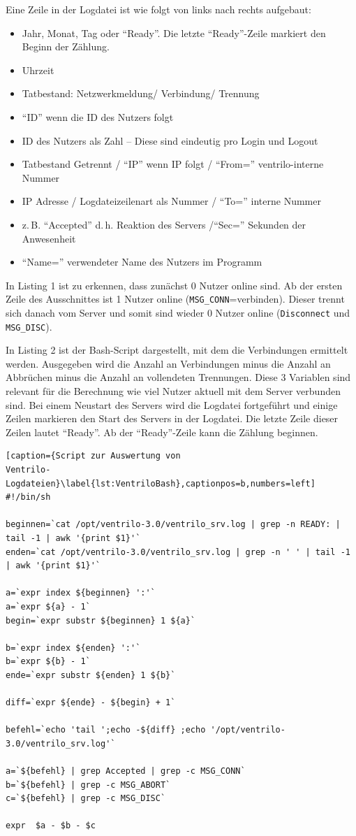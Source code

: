 \documentclass[12pt,ngerman,toc=listofnumbered,toc=bibliographynumbered,toc=index,headsepline=true]{scrbook}
\begin{document}
Eine Zeile in der Logdatei ist wie folgt von links nach rechts aufgebaut:
\begin{itemize}
  \item Jahr, Monat, Tag oder \enquote{Ready}. Die letzte \enquote{Ready}-Zeile
  markiert den Beginn der Zählung.
  \item Uhrzeit
  \item Tatbestand: Netzwerkmeldung/ Verbindung/ Trennung
  \item \enquote{ID}  wenn die ID des Nutzers folgt
  \item ID des Nutzers als Zahl -- Diese sind eindeutig pro Login und Logout
  \item Tatbestand Getrennt / \enquote{IP} wenn IP folgt / \enquote{From=}
  ventrilo-interne Nummer
  \item IP Adresse / Logdateizeilenart als Nummer / \enquote{To=} interne Nummer
  \item z.\,B. \enquote{Accepted} d.\,h. Reaktion des Servers /\enquote{Sec=}
  Sekunden der Anwesenheit
  \item \enquote{Name=} verwendeter Name des Nutzers im Programm 
\end{itemize}

In Listing 1 ist zu erkennen, dass zunächst 0 Nutzer
online sind. Ab der ersten Zeile des Ausschnittes ist 1 Nutzer online
(\texttt{MSG\_CONN}=verbinden). Dieser trennt sich danach vom Server und somit
sind wieder 0 Nutzer online (\texttt{Disconnect} und \texttt{MSG\_DISC}).

In Listing 2 ist der Bash-Script dargestellt, mit dem die Verbindungen ermittelt
werden. Ausgegeben wird die Anzahl an Verbindungen minus die Anzahl an Abbrüchen
minus die Anzahl an vollendeten Trennungen. Diese 3 Variablen sind relevant für
die Berechnung wie viel Nutzer aktuell mit dem Server verbunden sind. Bei einem
Neustart des Servers wird die Logdatei fortgeführt und einige Zeilen markieren
den Start des Servers in der Logdatei. Die letzte Zeile dieser Zeilen lautet
\enquote{Ready}. Ab der \enquote{Ready}-Zeile kann die Zählung beginnen.

\begin{lstlisting}[caption={Script zur Auswertung von
Ventrilo-Logdateien}\label{lst:VentriloBash},captionpos=b,numbers=left]
#!/bin/sh

beginnen=`cat /opt/ventrilo-3.0/ventrilo_srv.log | grep -n READY: | tail -1 | awk '{print $1}'`
enden=`cat /opt/ventrilo-3.0/ventrilo_srv.log | grep -n ' ' | tail -1 | awk '{print $1}'`

a=`expr index ${beginnen} ':'`
a=`expr ${a} - 1`
begin=`expr substr ${beginnen} 1 ${a}`

b=`expr index ${enden} ':'`
b=`expr ${b} - 1`
ende=`expr substr ${enden} 1 ${b}`

diff=`expr ${ende} - ${begin} + 1`

befehl=`echo 'tail ';echo -${diff} ;echo '/opt/ventrilo-3.0/ventrilo_srv.log'`

a=`${befehl} | grep Accepted | grep -c MSG_CONN`
b=`${befehl} | grep -c MSG_ABORT`
c=`${befehl} | grep -c MSG_DISC`

expr  $a - $b - $c
\end{lstlisting}
\end{document}
